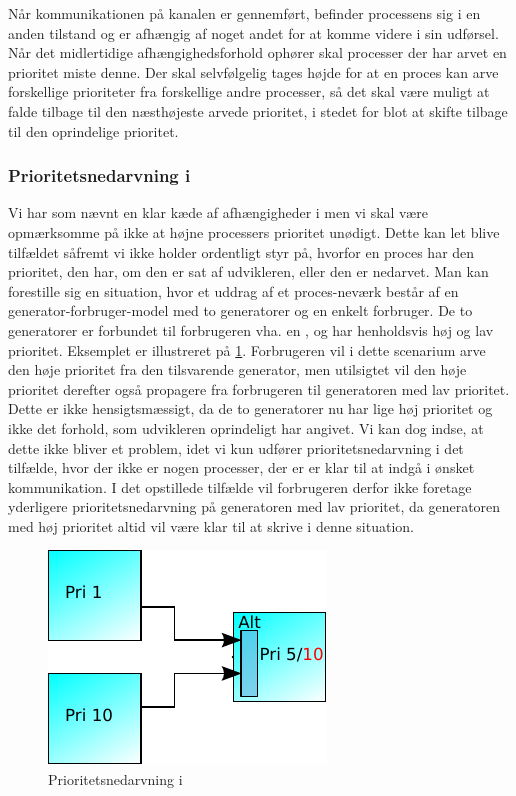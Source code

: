 Når kommunikationen på kanalen er gennemført, befinder processens sig i en anden tilstand og er afhængig af noget andet for at komme videre i sin udførsel. 
Når det midlertidige afhængighedsforhold ophører skal processer der har arvet en prioritet miste denne. Der skal selvfølgelig tages højde for at en proces kan arve forskellige prioriteter fra forskellige andre processer, så det skal være muligt at falde tilbage til den næsthøjeste arvede prioritet, i stedet for blot at skifte tilbage til den oprindelige prioritet. 

\subsubsection*{Prioritetsnedarvning i }
Vi har som nævnt en klar kæde af afhængigheder i \pycsp men vi skal være opmærksomme på ikke at højne processers prioritet unødigt. Dette kan let blive tilfældet såfremt vi ikke holder ordentligt styr på, hvorfor en proces har den prioritet, den har, om den er sat af udvikleren, eller den er nedarvet. Man kan forestille sig en situation, hvor et uddrag af et proces-neværk består af en generator-forbruger-model med to generatorer og en enkelt forbruger. De to generatorer er forbundet til forbrugeren vha. en , og har henholdsvis høj og lav prioritet. Eksemplet er illustreret på \cref{fig:alt-inheritance}. Forbrugeren vil i dette scenarium arve den høje prioritet fra den tilsvarende generator, men utilsigtet vil den høje prioritet derefter også propagere fra forbrugeren til generatoren med lav prioritet. Dette er ikke hensigtsmæssigt, da de to generatorer nu har lige høj prioritet og ikke det forhold, som udvikleren oprindeligt har angivet. Vi kan dog indse, at dette ikke bliver et problem, idet vi kun udfører prioritetsnedarvning i det tilfælde, hvor der ikke er nogen processer, der er er klar til at indgå i ønsket kommunikation. I det opstillede tilfælde vil forbrugeren derfor ikke foretage yderligere prioritetsnedarvning på generatoren med lav prioritet, da generatoren med høj prioritet altid vil være klar til at skrive i denne situation. 

\begin{figure}
 \begin{center}
  \includegraphics[scale=1.00]{images/alt-inheritance}
  \caption{Prioritetsnedarvning i }
  \label{fig:alt-inheritance}
  \end{center}
\end{figure}
